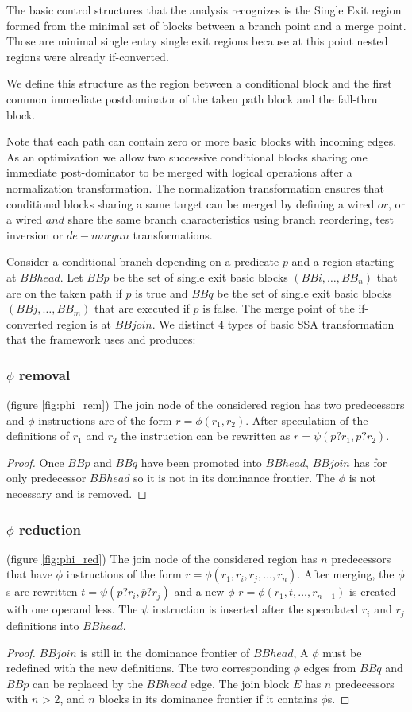 The basic control structures that the analysis recognizes is the Single Exit region formed from the minimal set of blocks between a branch point and a merge point.  Those are minimal single entry single exit regions because at this point nested regions were already if-converted.

 We define this structure as the region between a conditional block and the first common immediate postdominator of the taken path block and the fall-thru block.

Note that each path can contain zero or more basic blocks with incoming edges.
As an optimization we allow two successive conditional blocks sharing one immediate post-dominator to be merged with logical operations after a normalization transformation. The normalization transformation ensures that conditional blocks sharing a same target can be merged by defining a wired $or$, or a wired $and$ share the same branch characteristics using branch reordering, test inversion or $de-morgan$ transformations.

Consider a conditional branch depending on a predicate $p$ and a region starting at $BBhead$. Let $BBp$ be the set of single exit basic blocks $(BBi,\dots,BB_n)$ that are on the taken path if $p$ is true and $BBq$ be the set of single exit basic blocks $(BBj,\dots,BB_m)$ that are executed if $p$ is false. The merge point of the if-converted region is at $BBjoin$. We distinct 4 types of basic SSA transformation that the framework uses and produces:
\subsubsection{$\phi$ removal} (figure \ref{fig:phi_rem})
The join node of the considered region has two predecessors and $\phi$ instructions are of the form $r=\phi(r_1,r_2)$. After speculation of the definitions of $r_1$ and $r_2$ the instruction can be rewritten as $r=\psi(p?r_1,\overline{p}?r_2)$.
\begin{proof} Once $BBp$ and $BBq$ have been promoted into $BBhead$, $BBjoin$ has for only predecessor $BBhead$ so it is not in its dominance frontier. The $\phi$ is not necessary and is removed.
\end{proof}
\subsubsection{$\phi$ reduction} (figure \ref{fig:phi_red})
 The join node of the considered region has $n$ predecessors that have $\phi$ instructions of the form $r=\phi(r_1,r_i,r_j,\dots,r_n)$. After merging, the $\phi$s are rewritten $t=\psi(p?r_i,\overline{p}?r_j)$ and a new $\phi$ $r=\phi(r_1,t,\dots,r_{n-1})$ is created with one operand less. The $\psi$ instruction is inserted after the speculated $r_i$ and $r_j$ definitions into $BBhead$.
\begin{proof} $BBjoin$ is still in the dominance frontier of $BBhead$, A $\phi$ must be redefined with the new definitions. The two corresponding $\phi$ edges from $BBq$ and $BBp$ can be replaced by the $BBhead$ edge.
The join block $E$ has $n$ predecessors with $n$ > 2, and $n$ blocks in its dominance frontier if it contains $\phi$s.
\end{proof}
